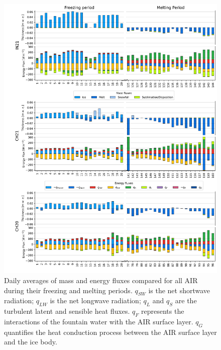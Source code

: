 \documentclass[utf8]{frontiersSCNS} %
\begin{document}
\begin{figure} \begin{center} \includegraphics[width=\linewidth]{Figures/mass_energy_bal.jpg} \end{center}
\caption{Daily averages of mass and energy fluxes compared for all AIR during their freezing and melting periods.
    $q_{SW}$ is the net shortwave radiation; $q_{LW}$ is the net longwave radiation; $q_{L}$ and $q_{S}$ are the
    turbulent latent and sensible heat fluxes. $q_{F}$ represents the interactions of the fountain water with the AIR
    surface layer.  $q_{G}$ quantifies the heat conduction process between the AIR surface layer and the ice body. }
\label{fig:MEB} \end{figure}
\end{document}
